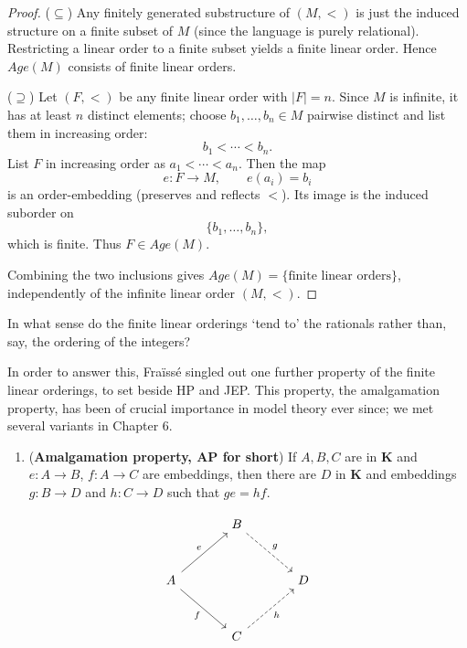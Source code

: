 \begin{proof}
    ($\subseteq$) Any finitely generated substructure of $(M,<)$ is just the
    induced structure on a finite subset of $M$ (since the language is purely
    relational). Restricting a linear order to a finite subset yields a finite
    linear order. Hence $Age(M)$ consists of finite linear orders.

    ($\supseteq$) Let $(F,<)$ be any finite linear order with $|F|=n$. Since $M$ is
    infinite, it has at least $n$ distinct elements; choose $b_1,\dots,b_n\in M$
    pairwise distinct and list them in increasing order:
    \[ b_1<\cdots<b_n. \]
    List $F$ in increasing order as $a_1<\cdots<a_n$. Then the map
    \[
        e\colon F\to M,\qquad e(a_i)=b_i
    \]
    is an order-embedding (preserves and reflects $<$). Its image is the induced
    suborder on
    \[
        \{b_1,\dots,b_n\},
    \] which is finite. Thus $F\in Age(M)$.

    Combining the two inclusions gives $Age(M)=\{\text{finite linear orders}\}$,
    independently of the infinite linear order $(M,<)$.
\end{proof}





In what sense do the finite linear orderings ‘tend to’ the rationals rather than, say, the ordering of the integers?

In order to answer this, Fraïssé singled out one further property of the finite linear orderings, to set beside HP and JEP. This property, the amalgamation property, has been of crucial importance in model theory ever since; we met several variants in Chapter 6.

\begin{enumerate}
    \item [(1.3)] \label{Hodges:tag7.1.3}(\textbf{Amalgamation property, AP for short}) If \( A, B, C \) are in \( \mathbf{K} \) and \( e\colon A \to B \), \( f\colon A \to C \) are embeddings, then there are \( D \) in \( \mathbf{K} \) and embeddings \( g\colon B \to D \) and \( h\colon C \to D \) such that \( ge = hf \).

\end{enumerate}

\[
    \begin{tikzcd}[row sep=3em, column sep=3.5em, ampersand replacement = \&]
        \& B \ar[dashed,dr,"g"] \& \\
        A \ar[ur,"e"] \ar[dr,"f"']
        \& \& D \\
        \& C \ar[dashed,ur,"h"'] \&
    \end{tikzcd}
\]


